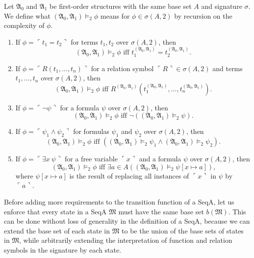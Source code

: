 \documentclass[12pt]{article}
\numberwithin{equation}{section}
\begin{document}
\begin{defi}
Let $\mathfrak{A}_0$ and $\mathfrak{A}_1$ be first-order structures with the same base set $A$ and signature $\sigma$. We define what $(\mathfrak{A}_0, \mathfrak{A}_1) \models_2 \phi$ means for $\phi \in \sigma(A, 2)$ by recursion on the complexity of $\phi$.
\begin{enumerate}[label=(\arabic*)]
    \item If $\phi = \ulcorner t_1 = t_2 \urcorner$ for terms $t_1, t_2$ over $\sigma(A, 2)$, then $$(\mathfrak{A}_0, \mathfrak{A}_1) \models_2 \phi \text{ iff } t_1^{(\mathfrak{A}_0, \mathfrak{A}_1)} = t_2^{(\mathfrak{A}_0, \mathfrak{A}_1)} \text{.}$$
    \item If $\phi = \ulcorner R(t_1, \dots, t_n) \urcorner$ for a relation symbol $\ulcorner R \urcorner \in \sigma(A, 2)$ and terms $t_1, \dots, t_n$ over $\sigma(A, 2)$, then $$(\mathfrak{A}_0, \mathfrak{A}_1) \models_2 \phi \text{ iff } R^{(\mathfrak{A}_0, \mathfrak{A}_1)} (t_1^{(\mathfrak{A}_0, \mathfrak{A}_1)}, \dots, t_n^{(\mathfrak{A}_0, \mathfrak{A}_1)}) \text{.}$$
    \item If $\phi = \ulcorner \neg \psi \urcorner$ for a formula $\psi$ over $\sigma(A, 2)$, then $$(\mathfrak{A}_0, \mathfrak{A}_1) \models_2 \phi \text{ iff } \neg ((\mathfrak{A}_0, \mathfrak{A}_1) \models_2 \psi) \text{.}$$
    \item If $\phi = \ulcorner \psi_1 \wedge \psi_2 \urcorner$ for formulas $\psi_1$ and $\psi_2$ over $\sigma(A, 2)$, then $$(\mathfrak{A}_0, \mathfrak{A}_1) \models_2 \phi \text{ iff } ((\mathfrak{A}_0, \mathfrak{A}_1) \models_2 \psi_1 \wedge (\mathfrak{A}_0, \mathfrak{A}_1) \models_2 \psi_2) \text{.}$$
    \item If $\phi = \ulcorner \exists x \ \psi \urcorner$ for a free variable $\ulcorner x \urcorner$ and a formula $\psi$ over $\sigma(A, 2)$, then $$(\mathfrak{A}_0, \mathfrak{A}_1) \models_2 \phi \text{ iff } \exists a \in A ((\mathfrak{A}_0, \mathfrak{A}_1) \models_2 \psi[x \mapsto a]) \text{,}$$ where $\psi[x \mapsto a]$ is the result of replacing all instances of $\ulcorner x \urcorner$ in $\psi$ by $\ulcorner a \urcorner$.
\end{enumerate}
\end{defi}

Before adding more requirements to the transition function of a SeqA, let us enforce that every state in a SeqA $\mathfrak{M}$ must have the same base set $b(\mathfrak{M})$. This can be done without loss of generality in the definition of a SeqA, because we can extend the base set of each state in $\mathfrak{M}$ to be the union of the base sets of states in $\mathfrak{M}$, while arbitrarily extending the interpretation of function and relation symbols in the signature by each state.
\end{document}
